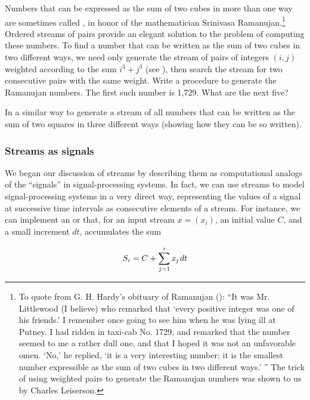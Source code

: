 \begin{exerciseGroup}
\label{Exercise 3.71}
 Numbers that can be expressed as
the sum of two cubes in more than one way are sometimes called
, in honor of the mathematician Srinivasa
Ramanujan.\footnote{To quote from G. H. Hardy's obituary of Ramanujan ():
``It was Mr. Littlewood (I believe) who remarked that `every positive
integer was one of his friends.'  I remember once going to see him when he was
lying ill at Putney.  I had ridden in taxi-cab No. 1729, and remarked that the
number seemed to me a rather dull one, and that I hoped it was not an
unfavorable omen.  `No,' he replied, `it is a very interesting number; it is
the smallest number expressible as the sum of two cubes in two different ways.'
'' The trick of using weighted pairs to generate the Ramanujan numbers was
shown to us by Charles Leiserson.} Ordered streams of pairs provide an elegant
solution to the problem of computing these numbers.  To find a number that can
be written as the sum of two cubes in two different ways, we need only generate
the stream of pairs of integers \( (i, j) \) weighted according to the sum
\( i^3 + j^3 \) (see ), then search the stream for two
consecutive pairs with the same weight.  Write a procedure to generate the
Ramanujan numbers.  The first such number is 1,729.  What are the next five?

\label{Exercise 3.72}
 In a similar way to 
generate a stream of all numbers that can be written as the sum of two
squares in three different ways (showing how they can be so written).
\end{exerciseGroup}

\subsubsection*{Streams as signals}

We began our discussion of streams by describing them as computational analogs
of the ``signals'' in signal-processing systems.  In fact, we can use streams
to model signal-processing systems in a very direct way, representing the
values of a signal at successive time intervals as consecutive elements of a
stream.  For instance, we can implement an  or
 that, for an input stream \( x = (x_i) \), an initial
value \( C \), and a small increment \( dt \), accumulates the sum

$$ S_i = C + \sum_{j=1}^i x_{\kern-0.07em j} \kern0.1em dt $$

